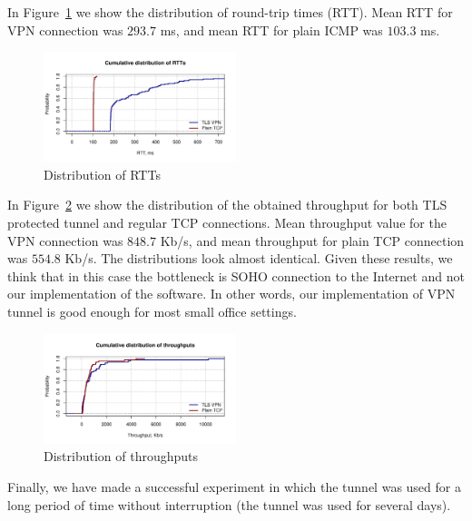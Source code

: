 In Figure~\ref{fig:rtt} we show the distribution of round-trip times
(RTT). Mean RTT for VPN connection was $293.7$ ms, and mean RTT for 
plain ICMP was $103.3$ ms.

\begin{figure}[!h]
        \includegraphics[width=0.5\textwidth]{graphics/rtt.pdf}
        \caption{Distribution of RTTs}
        \label{fig:rtt}
\end{figure}

In Figure~\ref{fig:iperf_distr} we show the distribution of the obtained throughput for both
TLS protected tunnel and regular TCP connections. Mean throughput value for the VPN connection was 
$848.7$ Kb/s, and mean throughput for plain TCP connection was $554.8$ Kb/s. The distributions 
look almost identical. Given these results, we think that in this case the bottleneck is SOHO
connection to the Internet and not our implementation of the software. In other words, 
our implementation of VPN tunnel is good enough for most small office settings.

\begin{figure}[!h]
        \includegraphics[width=0.5\textwidth]{graphics/throughput.pdf}
        \caption{Distribution of throughputs}
        \label{fig:iperf_distr}
\end{figure}

Finally, we have made a successful experiment in which the tunnel was used for a long period of time
without interruption (the tunnel was used for several days).

